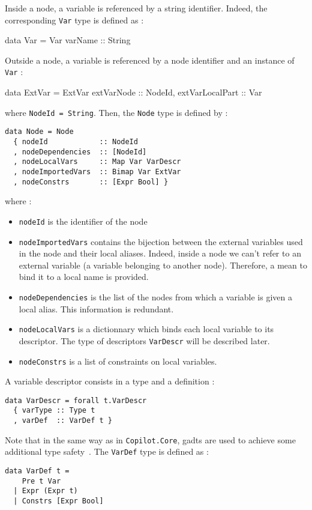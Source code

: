 Inside a node, a variable is referenced by a string identifier. Indeed, the corresponding \texttt{Var} type is defined as :
\begin{code}
data Var = Var {varName :: String}
\end{code}
Outside a node, a variable is referenced by a node identifier and an instance of \texttt{Var} :
\begin{code}
data ExtVar = ExtVar {extVarNode :: NodeId, extVarLocalPart :: Var} 
\end{code}
where \texttt{NodeId = String}. Then, the \texttt{Node} type is defined by :
\begin{lstlisting}[frame=single]
data Node = Node
  { nodeId            :: NodeId
  , nodeDependencies  :: [NodeId]
  , nodeLocalVars     :: Map Var VarDescr
  , nodeImportedVars  :: Bimap Var ExtVar 
  , nodeConstrs       :: [Expr Bool] }
\end{lstlisting} 
where :
\begin{itemize}
\item \texttt{nodeId} is the identifier of the node
\item \texttt{nodeImportedVars} contains the bijection between the external variables used in the node and their local aliases. Indeed, inside a node we can't refer to an external variable (a variable belonging to another node). Therefore, a mean to bind it to a local name is provided.
\item \texttt{nodeDependencies} is the list of the nodes from which a variable is given a local alias. This information is redundant.
\item \texttt{nodeLocalVars} is a dictionnary which binds each local variable to its descriptor. The type of descriptors \texttt{VarDescr} will be described later.
\item \texttt{nodeConstrs} is a list of constraints on local variables.
\end{itemize}
A variable descriptor consists in a type and a definition :
\begin{lstlisting}[frame=single]
data VarDescr = forall t.VarDescr
  { varType :: Type t
  , varDef  :: VarDef t }
\end{lstlisting}
Note that in the same way as in \texttt{Copilot.Core}, {\sc gadt}s are used to achieve some additional type safety~\cite{}. The \texttt{VarDef} type is defined as :
\begin{lstlisting}[frame=single]
data VarDef t =
    Pre t Var
  | Expr (Expr t)
  | Constrs [Expr Bool]
\end{lstlisting}
